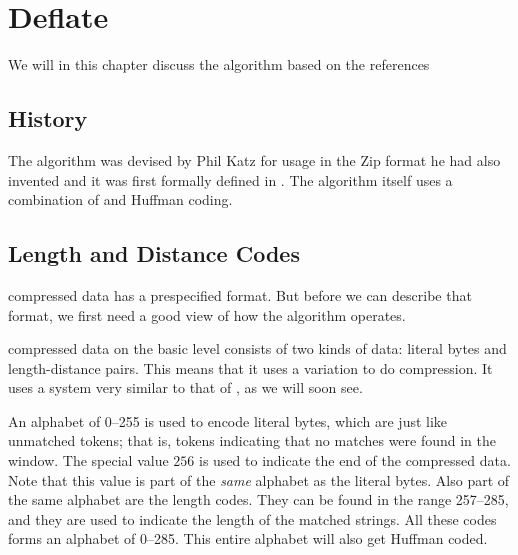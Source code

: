 \begin{comment}
  
\end{comment}

\chapter{Deflate}
\label{cha:deflate}

We will in this chapter discuss the  algorithm based on the
references
\cite{pkware:_appnot,deutsch96:_deflat_compr_data_format_specif,Salomon:2004:DCC,feldspar:_explan_deflat_algor}

\section{History}

The  algorithm was devised by Phil Katz for usage in the Zip
format he had also invented and it was first formally defined in
\cite{deutsch96:_deflat_compr_data_format_specif}. The algorithm
itself uses a combination of \lzone and Huffman coding.

\section{Length and Distance Codes}

 compressed data has a prespecified format. But before we can
describe that format, we first need a good view of how the algorithm
operates.

 compressed data on the basic level consists of two kinds of
data: literal bytes and length-distance pairs. This means that it uses
a \lzone variation to do compression. It uses a system very similar to
that of \lzss, as we will soon see.

An alphabet of 0--255 is used to encode literal bytes, which are just
like unmatched tokens; that is, tokens indicating that no matches were
found in the \lzone window. The special value $256$ is used to
indicate the end of the compressed data. Note that this value is part
of the \textit{same} alphabet as the literal bytes. Also part of the
same alphabet are the length codes. They can be found in the range
257--285, and they are used to indicate the length of the \lzone
matched strings. All these codes forms an alphabet of 0--285. This
entire alphabet will also get Huffman coded.

